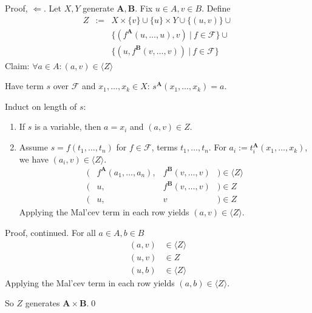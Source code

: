 \documentclass{beamer}
\theoremstyle{definition}
\newcommand{\setsuchthat}{\ \pmb{|}\ }
\newcommand{\F}{\mathcal{F}}
\newcommand{\A}{{\mathbf A}}
\newcommand{\B}{{\mathbf B}}
\begin{document}
\begin{frame}
\begin{block}{Proof, $\Leftarrow$.} 
 Let $X,Y$ generate $\A,\B$. Fix $u\in A, v\in B$. Define
\begin{eqnarray*}
  Z & := & X\times\{v\} \cup \{u\}\times Y \cup \{(u,v)\} \cup \\
    && \{(f^\A(u,\dots,u),v) \setsuchthat f\in\F \} \cup \\
    && \{(u, f^\B(v,\dots,v)) \setsuchthat f\in\F \}
\end{eqnarray*}
{\color{blue} Claim:} $\forall a\in A\colon (a,v) \in \langle Z\rangle$
 
 Have term $s$ over $\F$ and $x_1,\dots,x_k\in X$: $s^\A(x_1,\dots,x_k) = a$.

 Induct on length of $s$:
\begin{enumerate}
\item If $s$ is a variable, then $a = x_i$ and $(a,v)\in Z$.
\item Assume $s = f(t_1,\dots,t_n)$ for $f\in\F$, terms $t_1,\dots,t_n$.
 For $a_i := t_i^\A(x_1,\dots,x_k)$, we have $(a_i,v)\in\langle Z\rangle$. %
\[ \begin{array}{llll}
 (& f^\A(a_1,\dots,a_n), & f^\B(v,\dots,v)&) \in \langle Z\rangle \\
 (& u, & f^\B(v,\dots,v)&) \in Z \\
 (& u, & v &) \in Z
\end{array} \]
 Applying the Mal'cev term in each row yields $(a,v)\in\langle Z\rangle$.
\end{enumerate}
\end{block}
\end{frame}


\begin{frame}
\begin{block}{Proof, continued.}
 For all $a\in A, b\in B$
\[ \begin{array}{ll}
 (a,v) & \in \langle Z\rangle \\
 (u,v) & \in Z \\
 (u,b) & \in \langle Z \rangle
\end{array} \]
 Applying the Mal'cev term in each row yields $(a,b)\in\langle Z\rangle$.

 So $Z$ generates $\A\times\B$.\qed
\end{block}

\end{frame}
\end{document}
